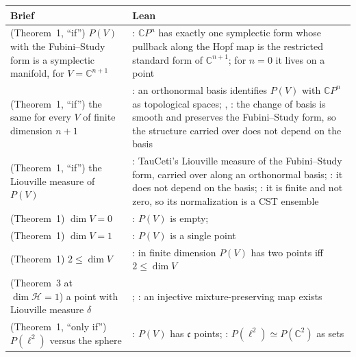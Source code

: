 \documentclass[11pt]{article}
\begin{document}
\begin{center}
\begin{tabularx}{\textwidth}{@{}BL@{}}
\toprule
Brief & Lean \\
\midrule
(Theorem~1, ``if'') $P(V)$ with the Fubini--Study form is a symplectic manifold, for
  $V = \mathbb C^{n+1}$ & : $\mathbb CP^n$ has
  exactly one symplectic form whose pullback along the Hopf map is the restricted standard form of
  $\mathbb C^{n+1}$; for $n = 0$ it lives on a point \\
(Theorem~1, ``if'') the same for every $V$ of finite dimension $n + 1$ &
  : an orthonormal basis identifies $P(V)$ with $\mathbb CP^n$ as
  topological spaces; ,
  : the change of basis is smooth and preserves the
  Fubini--Study form, so the structure carried over does not depend on the basis \\
(Theorem~1, ``if'') the Liouville measure of $P(V)$ & : TauCeti's
  Liouville measure of the Fubini--Study form, carried over along an orthonormal basis;
  : it does not depend on the basis;
  : it is finite and not zero, so its normalization
  is a CST ensemble \\
(Theorem~1) $\dim V = 0$ & : $P(V)$ is empty;
   \\
(Theorem~1) $\dim V = 1$ & : $P(V)$ is a single point \\
(Theorem~1) $2 \le \dim V$ & : in finite dimension $P(V)$
  has two points iff $2 \le \dim V$ \\
(Theorem~3 at $\dim\mathcal H = 1$) a point with Liouville measure $\delta$ &
  ; : an
  injective mixture-preserving map exists \\
(Theorem~1, ``only if'') $P(\ell^2)$ versus the sphere & : $P(V)$ has
  $\mathfrak c$ points; : $P(\ell^2) \simeq P(\mathbb C^2)$
  as sets \\
\bottomrule
\end{tabularx}
\end{center}
\end{document}
